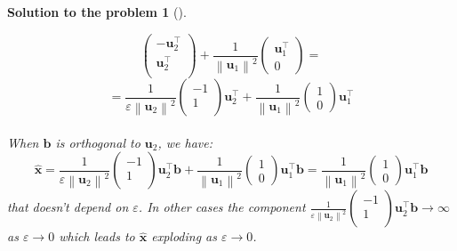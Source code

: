\documentclass[12pt,a4]{article}
\newtheorem{solution}{Solution to the problem}
\newcommand{\bb}{{\mathbf b}}
\newcommand{\bu}{{\mathbf u}}
\newcommand{\bx}{{\mathbf x}}
\newcommand{\norm}[1]{\left\lVert#1\right\rVert}
\begin{document}
\begin{solution}[]
\begin{enumerate}[(a)]
\[\begin{pmatrix} 
 - \bu_2^\top \\
 \bu_2^\top \\
\end{pmatrix}
+
\frac{1}{\norm{\bu_1}^2}
\begin{pmatrix} 
\bu_1^\top \\ 0
\end{pmatrix}
=
\]
\[
=
\frac{1}{\varepsilon\norm{\bu_2}^2}
\begin{pmatrix} 
 - 1 \\
 1 \\
\end{pmatrix}
\bu_2^\top
+
\frac{1}{\norm{\bu_1}^2}
\begin{pmatrix} 
1 \\ 0
\end{pmatrix}
\bu_1^\top
\]\\
When $\bb$ is orthogonal to $\bu_2$, we have:
\[
\hat \bx =
\frac{1}{\varepsilon\norm{\bu_2}^2}
\begin{pmatrix} 
 - 1 \\ 1 \\
\end{pmatrix}
\bu_2^\top \bb
+
\frac{1}{\norm{\bu_1}^2}
\begin{pmatrix} 
1 \\ 0
\end{pmatrix}
\bu_1^\top \bb 
=
\frac{1}{\norm{\bu_1}^2}
\begin{pmatrix} 
1 \\ 0
\end{pmatrix}
\bu_1^\top \bb 
\]
that doesn't depend on $\varepsilon$. In other cases the component 
$
\frac{1}{\varepsilon\norm{\bu_2}^2}
\begin{pmatrix} 
 - 1 \\ 1 \\
\end{pmatrix}
\bu_2^\top \bb
\to \infty$ as $\varepsilon\to0$ which leads to $\hat\bx$ exploding as $\varepsilon\to0$.

\end{enumerate}
\end{solution}
\end{document}

